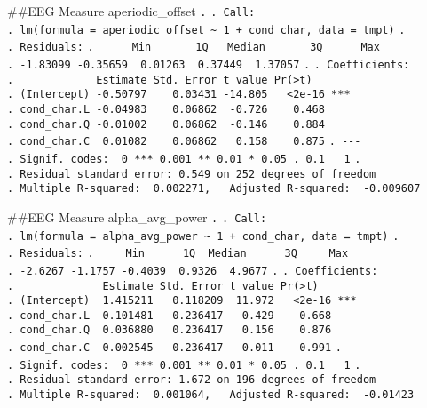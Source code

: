 \documentclass[
]{article}
\begin{document}
\#\#EEG Measure aperiodic\_offset \texttt{.} \texttt{.\ Call:}
\texttt{.\ lm(formula\ =\ aperiodic\_offset\ \textasciitilde{}\ 1\ +\ cond\_char,\ data\ =\ tmpt)}
\texttt{.} \texttt{.\ Residuals:}
\texttt{.\ \ \ \ \ \ Min\ \ \ \ \ \ \ 1Q\ \ \ Median\ \ \ \ \ \ \ 3Q\ \ \ \ \ \ Max}
\texttt{.\ -1.83099\ -0.35659\ \ 0.01263\ \ 0.37449\ \ 1.37057}
\texttt{.} \texttt{.\ Coefficients:}
\texttt{.\ \ \ \ \ \ \ \ \ \ \ \ \ Estimate\ Std.\ Error\ t\ value\ Pr(\textgreater{}\textbar{}t\textbar{})}
\texttt{.\ (Intercept)\ -0.50797\ \ \ \ 0.03431\ -14.805\ \ \ \textless{}2e-16\ ***}
\texttt{.\ cond\_char.L\ -0.04983\ \ \ \ 0.06862\ \ -0.726\ \ \ \ 0.468}
\texttt{.\ cond\_char.Q\ -0.01002\ \ \ \ 0.06862\ \ -0.146\ \ \ \ 0.884}
\texttt{.\ cond\_char.C\ \ 0.01082\ \ \ \ 0.06862\ \ \ 0.158\ \ \ \ 0.875}
\texttt{.\ -\/-\/-}
\texttt{.\ Signif.\ codes:\ \ 0\ \textquotesingle{}***\textquotesingle{}\ 0.001\ \textquotesingle{}**\textquotesingle{}\ 0.01\ \textquotesingle{}*\textquotesingle{}\ 0.05\ \textquotesingle{}.\textquotesingle{}\ 0.1\ \textquotesingle{}\ \textquotesingle{}\ 1}
\texttt{.}
\texttt{.\ Residual\ standard\ error:\ 0.549\ on\ 252\ degrees\ of\ freedom}
\texttt{.\ Multiple\ R-squared:\ \ 0.002271,\ \ \ Adjusted\ R-squared:\ \ -0.009607}

\#\#EEG Measure alpha\_avg\_power \texttt{.} \texttt{.\ Call:}
\texttt{.\ lm(formula\ =\ alpha\_avg\_power\ \textasciitilde{}\ 1\ +\ cond\_char,\ data\ =\ tmpt)}
\texttt{.} \texttt{.\ Residuals:}
\texttt{.\ \ \ \ \ Min\ \ \ \ \ \ 1Q\ \ Median\ \ \ \ \ \ 3Q\ \ \ \ \ Max}
\texttt{.\ -2.6267\ -1.1757\ -0.4039\ \ 0.9326\ \ 4.9677} \texttt{.}
\texttt{.\ Coefficients:}
\texttt{.\ \ \ \ \ \ \ \ \ \ \ \ \ \ Estimate\ Std.\ Error\ t\ value\ Pr(\textgreater{}\textbar{}t\textbar{})}
\texttt{.\ (Intercept)\ \ 1.415211\ \ \ 0.118209\ \ 11.972\ \ \ \textless{}2e-16\ ***}
\texttt{.\ cond\_char.L\ -0.101481\ \ \ 0.236417\ \ -0.429\ \ \ \ 0.668}
\texttt{.\ cond\_char.Q\ \ 0.036880\ \ \ 0.236417\ \ \ 0.156\ \ \ \ 0.876}
\texttt{.\ cond\_char.C\ \ 0.002545\ \ \ 0.236417\ \ \ 0.011\ \ \ \ 0.991}
\texttt{.\ -\/-\/-}
\texttt{.\ Signif.\ codes:\ \ 0\ \textquotesingle{}***\textquotesingle{}\ 0.001\ \textquotesingle{}**\textquotesingle{}\ 0.01\ \textquotesingle{}*\textquotesingle{}\ 0.05\ \textquotesingle{}.\textquotesingle{}\ 0.1\ \textquotesingle{}\ \textquotesingle{}\ 1}
\texttt{.}
\texttt{.\ Residual\ standard\ error:\ 1.672\ on\ 196\ degrees\ of\ freedom}
\texttt{.\ Multiple\ R-squared:\ \ 0.001064,\ \ \ Adjusted\ R-squared:\ \ -0.01423}
\end{document}
